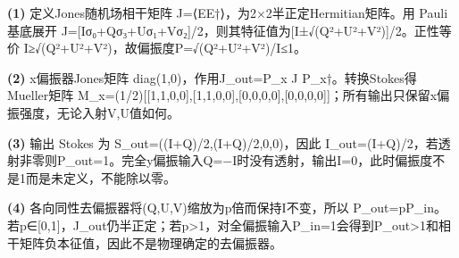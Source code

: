 \par\noindent\textbf{(1)} 定义Jones随机场相干矩阵 J=⟨EE†⟩，为2×2半正定Hermitian矩阵。用 Pauli 基底展开 J=[Iσ₀+Qσ₃+Uσ₁+Vσ₂]/2，则其特征值为[I±√(Q²+U²+V²)]/2。正性等价 I≥√(Q²+U²+V²)，故偏振度P=√(Q²+U²+V²)/I≤1。
\par\noindent\textbf{(2)} x偏振器Jones矩阵 diag(1,0)，作用J\_out=P\_x J P\_x†。转换Stokes得 Mueller矩阵 M\_x=(1/2)[[1,1,0,0],[1,1,0,0],[0,0,0,0],[0,0,0,0]]；所有输出只保留x偏振强度，无论入射V,U值如何。
\par\noindent\textbf{(3)} 输出 Stokes 为 S\_out=((I+Q)/2,(I+Q)/2,0,0)，因此 I\_out=(I+Q)/2，若透射非零则P\_out=1。完全y偏振输入Q=−I时没有透射，输出I=0，此时偏振度不是1而是未定义，不能除以零。
\par\noindent\textbf{(4)} 各向同性去偏振器将(Q,U,V)缩放为p倍而保持I不变，所以 P\_out=pP\_in。若p∈[0,1]，J\_out仍半正定；若p>1，对全偏振输入P\_in=1会得到P\_out>1和相干矩阵负本征值，因此不是物理确定的去偏振器。

